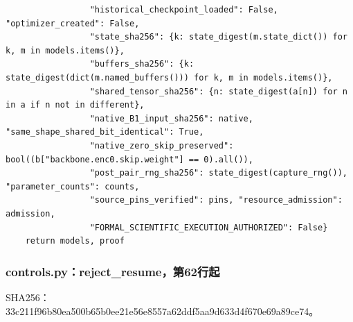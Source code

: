 \documentclass[UTF8,fontset=fandol,10pt]{ctexart}
\begin{document}
\begin{lstlisting}
                 "historical_checkpoint_loaded": False, "optimizer_created": False,
                 "state_sha256": {k: state_digest(m.state_dict()) for k, m in models.items()},
                 "buffers_sha256": {k: state_digest(dict(m.named_buffers())) for k, m in models.items()},
                 "shared_tensor_sha256": {n: state_digest(a[n]) for n in a if n not in different},
                 "native_B1_input_sha256": native, "same_shape_shared_bit_identical": True,
                 "native_zero_skip_preserved": bool((b["backbone.enc0.skip.weight"] == 0).all()),
                 "post_pair_rng_sha256": state_digest(capture_rng()), "parameter_counts": counts,
                 "source_pins_verified": pins, "resource_admission": admission,
                 "FORMAL_SCIENTIFIC_EXECUTION_AUTHORIZED": False}
    return models, proof
\end{lstlisting}


\subsubsection{controls.py：reject\_\allowbreak{}resume，第62行起}

SHA256：33c211f96b80\allowbreak{}ea500b65b0ee\allowbreak{}21e56e8557a6\allowbreak{}2ddf5aa9d633\allowbreak{}d4f670e69a89\allowbreak{}ce74。
\end{document}
